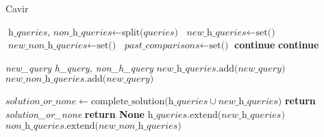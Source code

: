 \documentclass[]{article}
\begin{document}
\begin{algorithm}
	\caption{Cavir}\label{CAVIR}
	\begin{algorithmic}[1]
			\State $\textit{h\_queries, non\_h\_queries} \gets \text{split(}\textit{queries}\text{)}$
			\State $\textit{new\_h\_queries} \gets \text{set()}$
			\State $\textit{new\_non\_h\_queries} \gets \text{set()}$
			\State $\textit{past\_comparisons} \gets \text{set()}$
							\textbf{continue}
						\Else
						\EndIf
							\State \textbf{continue}
						\EndIf
						
									\State \textit{new\_query} \textit{h\_query, non\_h\_query}\text{)}
											\State $\textit{new\_h\_queries}\text{.add(}\textit{new\_query}\text{)}$
									\Else
											\State $\textit{new\_non\_h\_queries}\text{.add(}\textit{new\_query}\text{)}$
									\EndIf
								\EndIf
							\EndIf
						\EndIf
		
					\EndFor
				\EndFor
				\State $\textit{solution\_or\_none} \gets \text{complete\_solution(}\textit{h\_queries} \cup \textit{new\_h\_queries} )$
					\State \textbf{return} \textit{solution\_or\_none}
				\EndIf
					\State	\textbf{return None}
				\EndIf
				\State $\textit{h\_queries}\text{.extend(}\textit{new\_h\_queries})$
				\State $\textit{non\_h\_queries}\text{.extend(}\textit{new\_non\_h\_queries}\text{)}$
			\EndWhile
		\EndFunction
	\end{algorithmic}
\end{algorithm}
\end{document}
